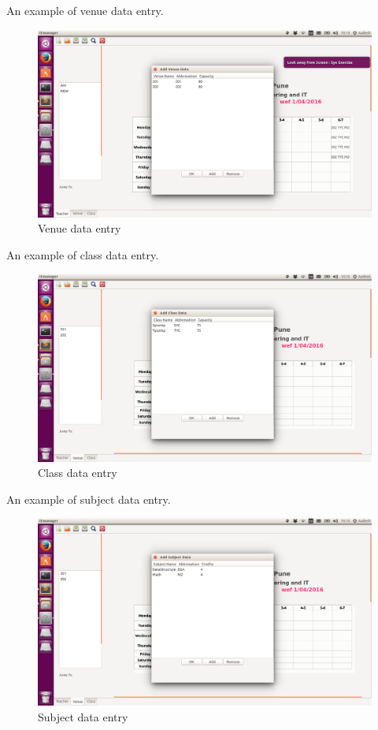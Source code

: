 An example of venue data entry.
\begin{figure}[ht!]
	\centering
	\includegraphics[width=160mm]{6.png}
	\caption{Venue data entry}
\end{figure}

\newpage
An example of class data entry.
\begin{figure}[ht!]
	\centering
	\includegraphics[width=160mm]{7.png}
	\caption{Class data entry}
\end{figure}

An example of subject data entry.
\begin{figure}[ht!]
	\centering
	 \includegraphics[width=160mm]{8.png}
	\caption{Subject data entry}
\end{figure}

